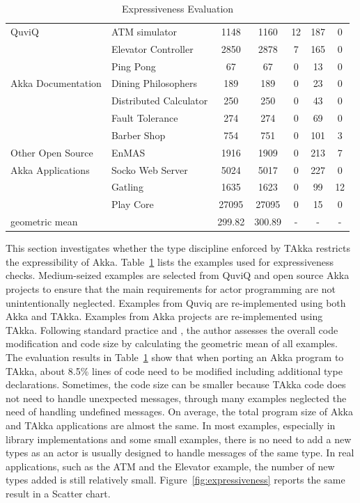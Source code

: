 \begin{table}
\begin{tabular}{| p{4.5 cm} | p{5.6 cm} | c | c |  c | c | c |}
\hline
QuviQ   & ATM simulator & 1148 & 1160 & 12 & 187 & 0 \\
\cline{2-7}
\citep{quviq}    & Elevator Controller & 2850 & 2878 & 7 & 165 & 0 \\
\hline
                     & Ping Pong & 67 & 67 & 0 & 13 & 0 \\
\cline{2-7}
Akka Documentation   & Dining Philosophers & 189 & 189 & 0 & 23 & 0  \\
\cline{2-7}
\citep{akka_doc}     & Distributed Calculator  & 250 & 250 & 0 & 43 & 0 \\
\cline{2-7}
                     & Fault Tolerance & 274 & 274 & 0 & 69 & 0 \\
\hline

               & Barber Shop \citep{BarberShop}& 754 & 751 & 0 & 101 & 3 \\
\cline{2-7}
Other Open Source    & EnMAS \citep{EnMAS} & 1916 & 1909 & 0 & 213 & 7 \\
\cline{2-7}
Akka Applications    & Socko Web Server \citep{SOCKO}  & 5024 & 5017  & 0 & 
227 & 0 \\
\cline{2-7}
                     & Gatling \citep{Gatling} & 1635 & 1623 & 0 & 99 & 12 \\
\cline{2-7}
              & Play Core \citep{play_doc} & 27095 & 27095 & 0 & 15 & 0 \\
\hline
geometric mean                   & & 299.82 & 300.89 & - & - & - \\
\hline
\end{tabular}
\caption{Expressiveness Evaluation}
\label{express}
\end{table}

This section investigates whether the type discipline enforced by TAkka restricts the 
expressibility of Akka.  Table~\ref{express} lists the examples used for expressiveness checks.  
Medium-seized examples are selected from QuviQ \citep{quviq}
and open source Akka projects to ensure that the main requirements for actor 
programming are not unintentionally neglected.  Examples from 
Quviq are re-implemented using both Akka and TAkka.  Examples from 
Akka projects are re-implemented using TAkka.  Following standard practice \citet{Fleming} and \citet{HePa06},  
the author assesses the overall code modification and code 
size by calculating the geometric mean of all examples. The evaluation results 
in Table~\ref{express} show that when porting an Akka program to TAkka, about 
8.5\% lines of code need to be modified including additional type declarations. 
Sometimes, the code size can be smaller because TAkka code does not 
need to handle unexpected messages, through many examples neglected the need
of handling undefined messages.  On average, the total program size 
of Akka and TAkka applications are almost the same.  In most examples, especially
in library implementations and some small examples, there is no need to add a new types
as an actor is usually designed to handle messages of the same type.  In real applications,
such as the ATM and the Elevator example, the number of new types added is still relatively small.
Figure~\ref{fig:expressiveness}
reports the same result in a Scatter chart.

